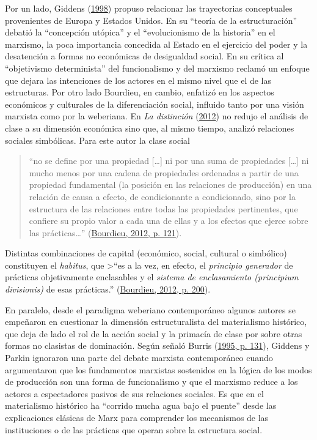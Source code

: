 \documentclass[
]{article}
\begin{document}
Por un lado, Giddens (\protect\hyperlink{ref-Giddens1998}{1998}) propuso relacionar las trayectorias conceptuales provenientes de Europa y Estados Unidos. En su ``teoría de la estructuración'' debatió la ``concepción utópica'' y el ``evolucionismo de la historia'' en el marxismo, la poca importancia concedida al Estado en el ejercicio del poder y la desatención a formas no económicas de desigualdad social. En su crítica al ``objetivismo determinista'' del funcionalismo y del marxismo reclamó un enfoque que dejara las intenciones de los actores en el mismo nivel que el de las estructuras. Por otro lado Bourdieu, en cambio, enfatizó en los aspectos económicos y culturales de la diferenciación social, influido tanto por una visión marxista como por la weberiana. En \emph{La distinción} (\protect\hyperlink{ref-Bourdieu2012}{2012}) no redujo el análisis de clase a su dimensión económica sino que, al mismo tiempo, analizó relaciones sociales simbólicas. Para este autor la clase social

\begin{quote}
``no se define por una propiedad {[}\ldots{]} ni por una suma de propiedades {[}\ldots{]} ni mucho menos por una cadena de propiedades ordenadas a partir de una propiedad fundamental (la posición en las relaciones de producción) en una relación de causa a efecto, de condicionante a condicionado, sino por la estructura de las relaciones entre todas las propiedades pertinentes, que confiere su propio valor a cada una de ellas y a los efectos que ejerce sobre las prácticas\ldots{}'' (\protect\hyperlink{ref-Bourdieu2012}{Bourdieu, 2012, p. 121}).
\end{quote}

Distintas combinaciones de capital (económico, social, cultural o simbólico) constituyen el \emph{habitus}, que \textgreater{}``es a la vez, en efecto, el \emph{principio generador} de prácticas objetivamente enclasables y el \emph{sistema de enclasamiento (principium divisionis)} de esas prácticas.'' (\protect\hyperlink{ref-Bourdieu2012}{Bourdieu, 2012, p. 200}).

En paralelo, desde el paradigma weberiano contemporáneo algunos autores se empeñaron en cuestionar la dimensión estructuralista del materialismo histórico, que deja de lado el rol de la acción social y la primacía de clase por sobre otras formas no clasistas de dominación. Según señaló Burris (\protect\hyperlink{ref-Burris1995}{1995, p. 131}), Giddens y Parkin ignoraron una parte del debate marxista contemporáneo cuando argumentaron que los fundamentos marxistas sostenidos en la lógica de los modos de producción son una forma de funcionalismo y que el marxismo reduce a los actores a espectadores pasivos de sus relaciones sociales. Es que en el materialismo histórico ha ``corrido mucha agua bajo el puente'' desde las explicaciones clásicas de Marx para comprender los mecanismos de las instituciones o de las prácticas que operan sobre la estructura social.
\end{document}
